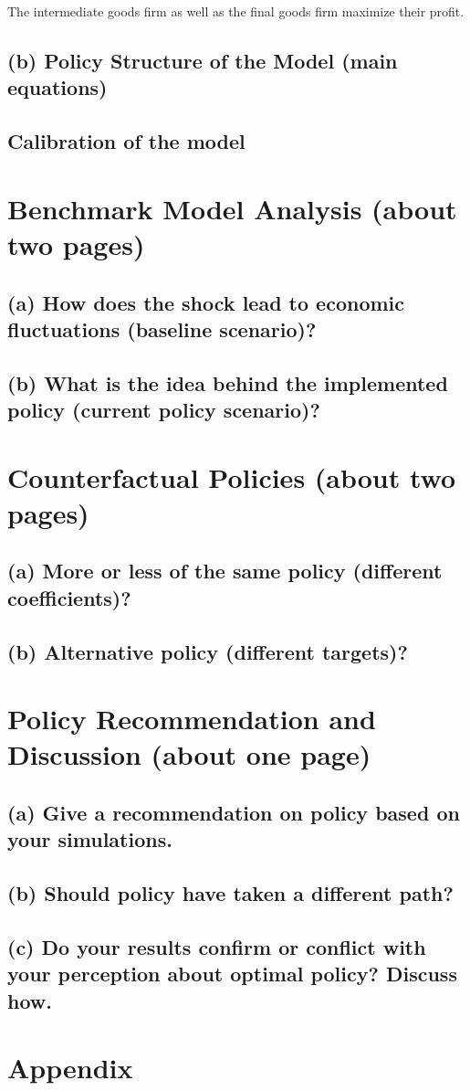 \documentclass[12pt]{article}
\begin{document}
The intermediate goods firm as well as the final goods firm maximize their profit. 


\subsection{(b) Policy Structure of the Model (main equations)} 
\subsection{Calibration of the model} 

\section{Benchmark Model Analysis (about two pages)}
\subsection{(a) How does the shock lead to economic fluctuations (baseline scenario)? }
\subsection{(b) What is the idea behind the implemented policy (current policy scenario)? }

\section{Counterfactual Policies (about two pages)}
\subsection{(a) More or less of the same policy (different coefficients)? }
\subsection{(b) Alternative policy (different targets)? }

\section{Policy Recommendation and Discussion (about one page)}
\subsection{(a) Give a recommendation on policy based on your simulations. }
\subsection{(b) Should policy have taken a different path? }
\subsection{(c) Do your results confirm or conflict with your perception about optimal policy? Discuss how. }




\section{Appendix}
\end{document}
